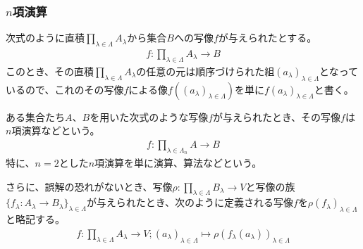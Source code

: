 \documentclass[dvipdfmx]{jsarticle}
\begin{document}
\subsubsection{$n$項演算}
\begin{dfn}
次式のように直積$\prod_{\lambda \in \varLambda} A_{\lambda}$から集合$B$への写像$f$が与えられたとする。
\begin{align*}
f:\prod_{\lambda \in \varLambda} A_{\lambda} \rightarrow B
\end{align*}
このとき、その直積$\prod_{\lambda \in \varLambda} A_{\lambda}$の任意の元は順序づけられた組$\left( a_{\lambda} \right)_{\lambda \in \varLambda}$となっているので、これのその写像$f$による像$f\left( \left( a_{\lambda} \right)_{\lambda \in \varLambda} \right)$を単に$f\left( a_{\lambda} \right)_{\lambda \in \varLambda}$と書く。
\end{dfn}
\begin{dfn}
ある集合たち$A$、$B$を用いた次式のような写像$f$が与えられたとき、その写像$f$は$n$項演算などという。
\begin{align*}
f:\prod_{\lambda \in \varLambda_{n}} A \rightarrow B
\end{align*}
特に、$n = 2$とした$n$項演算を単に演算、算法などという。
\end{dfn}
\begin{dfn}
さらに、誤解の恐れがないとき、写像$\rho :\prod_{\lambda \in \Lambda } B_{\lambda } \rightarrow V$と写像の族$\{f_{\lambda } :A_{\lambda } \rightarrow B_{\lambda } \}_{\lambda \in \varLambda }$が与えられたとき、次のように定義される写像$f$を$\rho \left(f_{\lambda } \right)_{\lambda \in \varLambda }$と略記する。
\begin{align*}
f:\prod_{\lambda \in \Lambda } A_{\lambda } \rightarrow V;\left( a_{\lambda } \right)_{\lambda \in \varLambda } \mapsto \rho \left(f_{\lambda } \left(a_{\lambda } \right) \right)_{\lambda \in \varLambda }
\end{align*}
\end{dfn}
\end{document}
